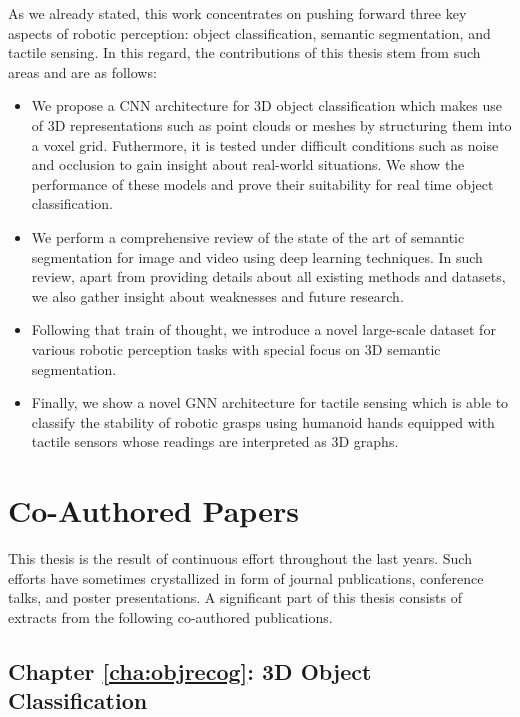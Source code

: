 As we already stated, this work concentrates on pushing forward three key aspects of robotic perception: object classification, semantic segmentation, and tactile sensing. In this regard, the contributions of this thesis stem from such areas and are as follows:

\begin{itemize}
    \item We propose a \acl{CNN} architecture for \acs{3D} object classification which makes use of \acs{3D} representations such as point clouds or meshes by structuring them into a voxel grid. Futhermore, it is tested under difficult conditions such as noise and occlusion to gain insight about real-world situations. We show the performance of these models and prove their suitability for real time object classification.
    \item We perform a comprehensive review of the state of the art of semantic segmentation for image and video using deep learning techniques. In such review, apart from providing details about all existing methods and datasets, we also gather insight about weaknesses and future research.
    \item Following that train of thought, we introduce a novel large-scale dataset for various robotic perception tasks with special focus on 3D semantic segmentation.
    \item Finally, we show a novel \acl{GNN} architecture for tactile sensing which is able to classify the stability of robotic grasps using humanoid hands equipped with tactile sensors whose readings are interpreted as \acs{3D} graphs.
\end{itemize}

\section{Co-Authored Papers}
\label{cha:introduction:sec:papers}

This thesis is the result of continuous effort throughout the last years. Such efforts have sometimes crystallized in form of journal publications, conference talks, and poster presentations. A significant part of this thesis consists of extracts from the following co-authored publications.

\subsection{Chapter \ref{cha:objrecog}: 3D Object Classification}


